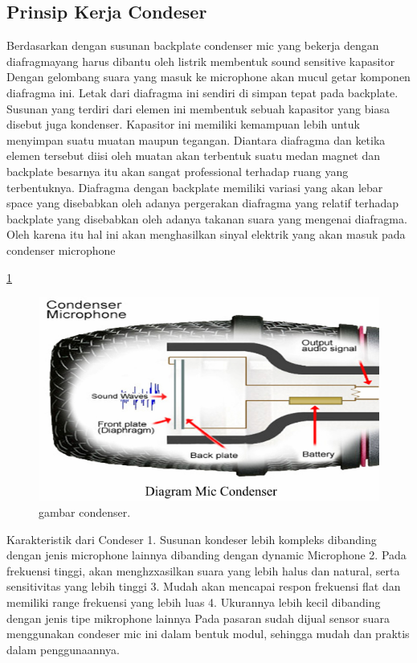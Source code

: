 \subsection {Prinsip Kerja Condeser}
Berdasarkan dengan susunan backplate condenser mic yang bekerja dengan diafragmayang harus dibantu oleh listrik membentuk sound sensitive kapasitor  Dengan gelombang suara yang masuk ke microphone akan mucul getar komponen diafragma ini. Letak dari diafragma ini sendiri di simpan tepat pada backplate. Susunan yang terdiri dari elemen ini membentuk sebuah kapasitor yang biasa disebut juga kondenser. Kapasitor ini memiliki kemampuan lebih untuk menyimpan suatu muatan maupun tegangan. Diantara diafragma dan ketika elemen tersebut diisi oleh muatan akan terbentuk suatu medan magnet dan backplate besarnya itu akan sangat professional terhadap ruang yang terbentuknya. Diafragma dengan backplate memiliki variasi yang akan lebar space yang disebabkan oleh adanya pergerakan diafragma yang relatif terhadap backplate yang disebabkan oleh adanya takanan suara yang mengenai diafragma. Oleh karena itu hal ini akan menghasilkan sinyal elektrik yang akan masuk pada condenser microphone

\ref{condenser.JPG}

\begin{figure}[ht]
\centerline{\includegraphics[width=1\textwidth]{figures/condenser.JPG}}
\caption{gambar condenser.}
\label{condenser.JPG}
\end{figure}

Karakteristik dari Condeser
1. Susunan kondeser lebih kompleks dibanding dengan jenis microphone lainnya dibanding dengan dynamic Microphone
2. Pada frekuensi tinggi, akan menghzxasilkan suara yang lebih halus dan natural, serta sensitivitas yang lebih tinggi
3. Mudah akan mencapai respon frekuensi flat dan memiliki range frekuensi yang lebih luas
4. Ukurannya lebih kecil dibanding dengan jenis tipe mikrophone lainnya
Pada pasaran sudah dijual sensor suara menggunakan condeser mic ini dalam bentuk modul, sehingga mudah dan praktis dalam penggunaannya.

